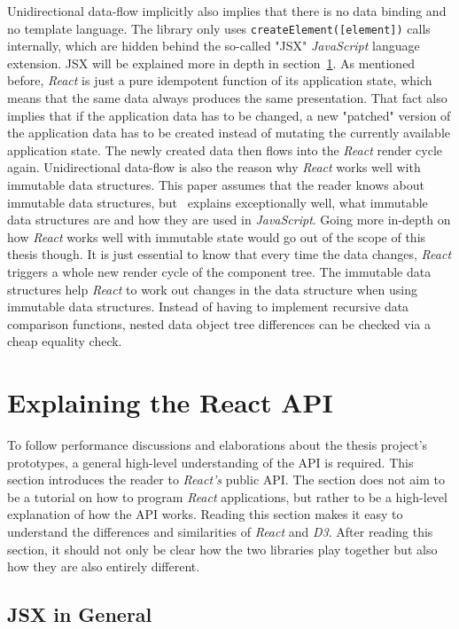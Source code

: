 Unidirectional data-flow implicitly also implies that there is no data binding and no template language. The library only uses \texttt{createElement([element])} calls internally, which are hidden behind the so-called "JSX" \emph{JavaScript} language extension. JSX will be explained more in depth in section~\ref{sec:reactApi}. As mentioned before, \emph{React} is just a pure idempotent function of its application state, which means that the same data always produces the same presentation. That fact also implies that if the application data has to be changed, a new "patched" version of the application data has to be created instead of mutating the currently available application state. The newly created data then flows into the \emph{React} render cycle again. Unidirectional data-flow is also the reason why \emph{React} works well with immutable data structures. This paper assumes that the reader knows about immutable data structures, but~\cite{ImmutableJS} explains exceptionally well, what immutable data structures are and how they are used in \emph{JavaScript}. Going more in-depth on how \emph{React} works well with immutable state would go out of the scope of this thesis though. It is just essential to know that every time the data changes, \emph{React} triggers a whole new render cycle of the component tree. The immutable data structures help \emph{React} to work out changes in the data structure when using immutable data structures. Instead of having to implement recursive data comparison functions, nested data object tree differences can be checked via a cheap equality check.

\section{Explaining the React API}
\label{sec:reactApi}

To follow performance discussions and elaborations about the thesis project's prototypes, a general high-level understanding of the API is required. This section introduces the reader to \emph{React's} public API. The section does not aim to be a tutorial on how to program \emph{React} applications, but rather to be a high-level explanation of how the API works. Reading this section makes it easy to understand the differences and similarities of \emph{React} and \emph{D3}. After reading this section, it should not only be clear how the two libraries play together but also how they are also entirely different.

\subsection{JSX in General}

